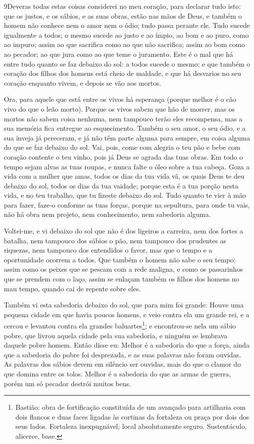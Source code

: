 \medskip

\lettrine{9} Deveras todas estas coisas considerei no meu
coração, para declarar tudo isto: que os justos, e os sábios, e as
suas obras, estão nas mãos de Deus, e também o homem não conhece nem
o amor nem o ódio; tudo passa perante ele. Tudo sucede
igualmente a todos; o mesmo sucede ao justo e ao ímpio, ao bom e ao
puro, como ao impuro; assim ao que sacrifica como ao que não
sacrifica; assim ao bom como ao pecador; ao que jura como ao que
teme o juramento. Este é o mal que há entre tudo quanto se faz
debaixo do sol: a todos sucede o mesmo; e que também o coração dos
filhos dos homens está cheio de maldade, e que há desvarios no seu
coração enquanto vivem, e depois se vão aos mortos.

Ora, para aquele que está entre os vivos há esperança (porque
melhor é o cão vivo do que o leão morto). Porque os vivos sabem
que hão de morrer, mas os mortos não sabem coisa nenhuma, nem
tampouco terão eles recompensa, mas a sua memória fica entregue ao
esquecimento. Também o seu amor, o seu ódio, e a sua inveja já
pereceram, e já não têm parte alguma para sempre, em coisa alguma do
que se faz debaixo do sol. Vai, pois, come com alegria o teu pão
e bebe com coração contente o teu vinho, pois já Deus se agrada das
tuas obras. Em todo o tempo sejam alvas as tuas roupas, e nunca
falte o óleo sobre a tua cabeça. Goza a vida com a mulher que
amas, todos os dias da tua vida vã, os quais Deus te deu debaixo do
sol, todos os dias da tua vaidade; porque esta é a tua porção nesta
vida, e no teu trabalho, que tu fizeste debaixo do sol. Tudo
quanto te vier à mão para fazer, faze-o conforme as tuas forças,
porque na sepultura, para onde tu vais, não há obra nem projeto, nem
conhecimento, nem sabedoria alguma.

Voltei-me, e vi debaixo do sol que não é dos ligeiros a carreira,
nem dos fortes a batalha, nem tampouco dos sábios o pão, nem
tampouco dos prudentes as riquezas, nem tampouco dos entendidos o
favor, mas que o tempo e a oportunidade ocorrem a todos. Que
também o homem não sabe o seu tempo; assim como os peixes que se
pescam com a rede maligna, e como os passarinhos que se prendem com
o laço, assim se enlaçam também os filhos dos homens no mau tempo,
quando cai de repente sobre eles.

Também vi esta sabedoria debaixo do sol, que para mim foi grande:
Houve uma pequena cidade em que havia poucos homens, e veio
contra ela um grande rei, e a cercou e levantou contra ela grandes
baluartes\footnote{Bastião: obra de fortificação constituída de um
avançado para artilharia com dois flancos e duas faces ligadas às
cortinas da fortaleza ou praça por dois dos seus lados. Fortaleza
inexpugnável; local absolutamente seguro. Sustentáculo, alicerce,
base.}; e encontrou-se nela um sábio pobre, que livrou aquela
cidade pela sua sabedoria, e ninguém se lembrava daquele pobre
homem. Então disse eu: Melhor é a sabedoria do que a força,
ainda que a sabedoria do pobre foi desprezada, e as suas palavras
não foram ouvidas. As palavras dos sábios devem em silêncio
ser ouvidas, mais do que o clamor do que domina entre os tolos.
Melhor é a sabedoria do que as armas de guerra, porém um só
pecador destrói muitos bens.


